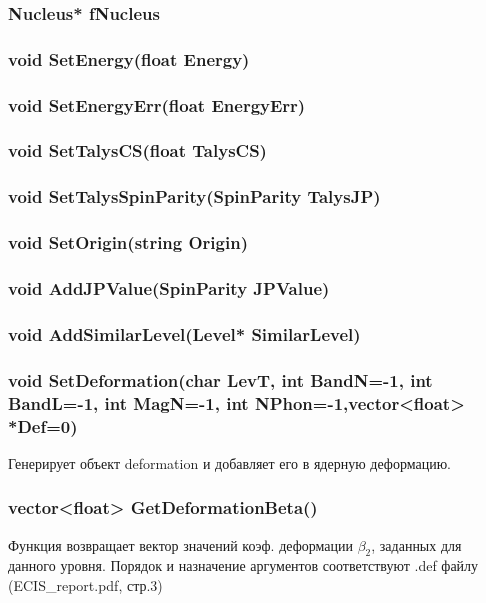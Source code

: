 \documentclass[a4paper,12pt]{extarticle}
\begin{document}
\subsubsection{Nucleus* fNucleus}

\subsubsection{void SetEnergy(float Energy)} 

\subsubsection{void SetEnergyErr(float EnergyErr)} 

\subsubsection{void SetTalysCS(float TalysCS)} 

\subsubsection{void SetTalysSpinParity(SpinParity TalysJP)}

\subsubsection{void SetOrigin(string Origin)} 

\subsubsection{void AddJPValue(SpinParity JPValue)}
 
\subsubsection{void AddSimilarLevel(Level* SimilarLevel)}
 
\subsubsection{void SetDeformation(char LevT, int BandN=-1, int BandL=-1, int MagN=-1, int NPhon=-1,vector<float> *Def=0)}
Генерирует объект deformation и добавляет его в ядерную деформацию.
\subsubsection{vector<float> GetDeformationBeta()}
Функция возвращает вектор значений коэф. деформации $\beta_2$, заданных для данного уровня.
Порядок и назначение аргументов соответствуют .def файлу (ECIS\_report.pdf, стр.3)
\end{document}
